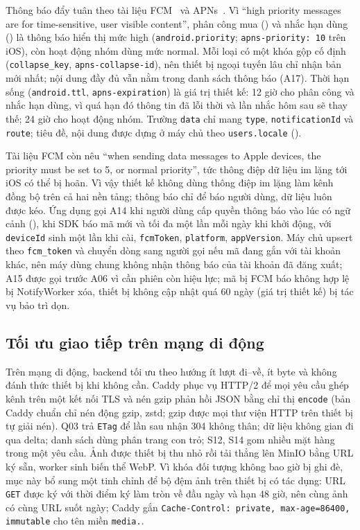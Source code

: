 Thông báo đẩy tuân theo tài liệu FCM~\cite{fcmpriority} và APNs~\cite{appleapns}. Vì “high priority messages are for time-sensitive, user visible content”, phân công mua () và nhắc hạn dùng () là thông báo hiển thị mức high (\texttt{android.priority}; \texttt{apns-priority: 10} trên iOS), còn hoạt động nhóm dùng mức normal. Mỗi loại có một khóa gộp cố định (\texttt{collapse\_key}, \texttt{apns-collapse-id}), nên thiết bị ngoại tuyến lâu chỉ nhận bản mới nhất; nội dung đầy đủ vẫn nằm trong danh sách thông báo (A17). Thời hạn sống (\texttt{android.ttl}, \texttt{apns-expiration}) là giá trị thiết kế: 12 giờ cho phân công và nhắc hạn dùng, vì quá hạn đó thông tin đã lỗi thời và lần nhắc hôm sau sẽ thay thế; 24 giờ cho hoạt động nhóm. Trường \texttt{data} chỉ mang \texttt{type}, \texttt{notificationId} và \texttt{route}; tiêu đề, nội dung được dựng ở máy chủ theo \texttt{users.locale} ().

Tài liệu FCM còn nêu “when sending data messages to Apple devices, the priority must be set to 5, or normal priority”, tức thông điệp dữ liệu im lặng tới iOS có thể bị hoãn. Vì vậy thiết kế không dùng thông điệp im lặng làm kênh đồng bộ trên cả hai nền tảng; thông báo chỉ để báo người dùng, dữ liệu luôn được kéo. Ứng dụng gọi A14 khi người dùng cấp quyền thông báo vào lúc có ngữ cảnh (), khi SDK báo mã mới và tối đa một lần mỗi ngày khi khởi động, với \texttt{deviceId} sinh một lần khi cài, \texttt{fcmToken}, \texttt{platform}, \texttt{appVersion}. Máy chủ upsert theo \texttt{fcm\_token} và chuyển dòng sang người gọi nếu mã đang gắn với tài khoản khác, nên máy dùng chung không nhận thông báo của tài khoản đã đăng xuất; A15 được gọi trước A06 vì cần phiên còn hiệu lực; mã bị FCM báo không hợp lệ bị NotifyWorker xóa, thiết bị không cập nhật quá 60 ngày (giá trị thiết kế) bị tác vụ bảo trì dọn.

\subsection{Tối ưu giao tiếp trên mạng di động}\label{ssec:toi-uu-mang}

Trên mạng di động, backend tối ưu theo hướng ít lượt đi–về, ít byte và không đánh thức thiết bị khi không cần. Caddy phục vụ HTTP/2 để mọi yêu cầu ghép kênh trên một kết nối TLS và nén gzip phản hồi JSON bằng chỉ thị \texttt{encode} (bản Caddy chuẩn chỉ nén động gzip, zstd; gzip được mọi thư viện HTTP trên thiết bị tự giải nén). Q03 trả \texttt{ETag} để lần sau nhận 304 không thân; dữ liệu không gian đi qua delta; danh sách dùng phân trang con trỏ; S12, S14 gom nhiều mặt hàng trong một yêu cầu. Ảnh được thiết bị thu nhỏ rồi tải thẳng lên MinIO bằng URL ký sẵn, worker sinh biến thể WebP. Vì khóa đối tượng không bao giờ bị ghi đè, mục này bổ sung một tinh chỉnh để bộ đệm ảnh trên thiết bị có tác dụng: URL \texttt{GET} được ký với thời điểm ký làm tròn về đầu ngày và hạn 48 giờ, nên cùng ảnh có cùng URL suốt ngày; Caddy gắn \texttt{Cache-Control: private, max-age=86400, immutable} cho tên miền \texttt{media.}.

